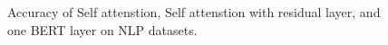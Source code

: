 \begin{figure}[t]
    \caption{Accuracy of Self attenstion, Self attenstion with residual layer, and one BERT layer on NLP datasets.}
    \label{fig:nlp_self_res}
\end{figure}




